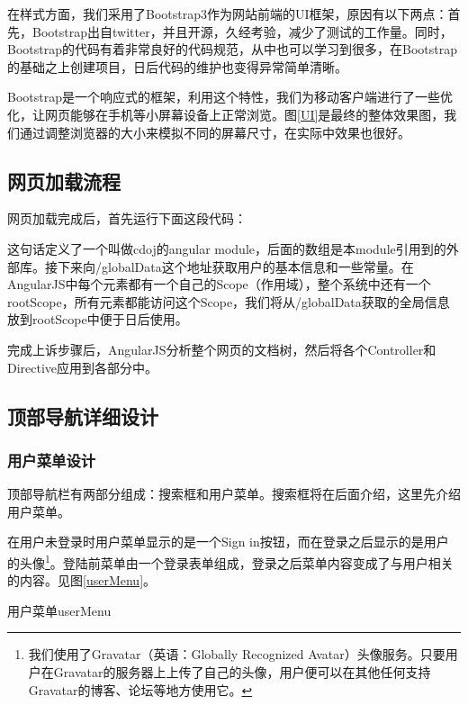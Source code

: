 在样式方面，我们采用了Bootstrap3作为网站前端的UI框架，原因有以下两点：首先，Bootstrap出自twitter，并且开源，久经考验，减少了测试的工作量。同时，Bootstrap的代码有着非常良好的代码规范，从中也可以学习到很多，在Bootstrap的基础之上创建项目，日后代码的维护也变得异常简单清晰。

Bootstrap是一个响应式的框架，利用这个特性，我们为移动客户端进行了一些优化，让网页能够在手机等小屏幕设备上正常浏览。图\ref{UI}是最终的整体效果图，我们通过调整浏览器的大小来模拟不同的屏幕尺寸，在实际中效果也很好。

\subsection{网页加载流程}
网页加载完成后，首先运行下面这段代码：



这句话定义了一个叫做cdoj的angular module，后面的数组是本module引用到的外部库。接下来向/globalData这个地址获取用户的基本信息和一些常量。在AngularJS中每个元素都有一个自己的Scope（作用域），整个系统中还有一个rootScope，所有元素都能访问这个Scope，我们将从/globalData获取的全局信息放到rootScope中便于日后使用。



完成上诉步骤后，AngularJS分析整个网页的文档树，然后将各个Controller和Directive应用到各部分中。

\subsection{顶部导航详细设计}
\subsubsection{用户菜单设计}
顶部导航栏有两部分组成：搜索框和用户菜单。搜索框将在后面介绍，这里先介绍用户菜单。

在用户未登录时用户菜单显示的是一个Sign in按钮，而在登录之后显示的是用户的头像\footnote{我们使用了Gravatar（英语：Globally Recognized Avatar）头像服务。只要用户在Gravatar的服务器上上传了自己的头像，用户便可以在其他任何支持Gravatar的博客、论坛等地方使用它。}。登陆前菜单由一个登录表单组成，登录之后菜单内容变成了与用户相关的内容。见图\ref{userMenu}。

\begin{pics}[htbp]{用户菜单}{userMenu}
\end{pics}


